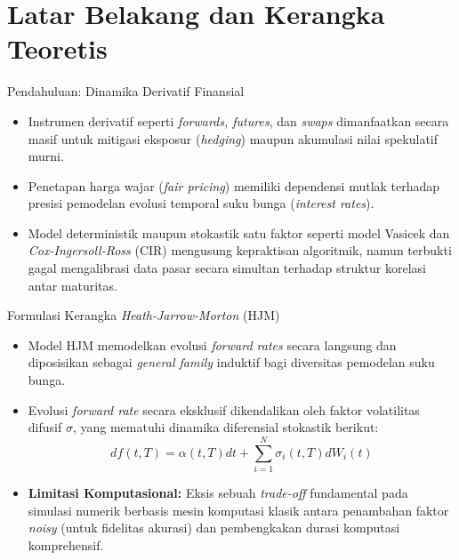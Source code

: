 \section{Latar Belakang dan Kerangka Teoretis}

\begin{frame}{Pendahuluan: Dinamika Derivatif Finansial}
    \begin{itemize}
        \item Instrumen derivatif seperti \textit{forwards, futures}, dan \textit{swaps} dimanfaatkan secara masif untuk mitigasi eksposur (\textit{hedging}) maupun akumulasi nilai spekulatif murni.
        \item Penetapan harga wajar (\textit{fair pricing}) memiliki dependensi mutlak terhadap presisi pemodelan evolusi temporal suku bunga (\textit{interest rates}).
        \item Model deterministik maupun stokastik satu faktor seperti model Vasicek dan \textit{Cox-Ingersoll-Ross} (CIR) mengusung kepraktisan algoritmik, namun terbukti gagal mengalibrasi data pasar secara simultan terhadap struktur korelasi antar maturitas.
    \end{itemize}
\end{frame}

\begin{frame}{Formulasi Kerangka \textit{Heath-Jarrow-Morton} (HJM)}
    \begin{itemize}
        \item Model HJM memodelkan evolusi \textit{forward rates} secara langsung dan diposisikan sebagai \textit{general family} induktif bagi diversitas pemodelan suku bunga.
        \item Evolusi \textit{forward rate} secara eksklusif dikendalikan oleh faktor volatilitas difusif $\sigma$, yang mematuhi dinamika diferensial stokastik berikut:
        $$ df(t, T) = \alpha(t, T)dt + \sum_{i=1}^N \sigma_i(t, T) dW_i(t) $$
        \item \textbf{Limitasi Komputasional:} Eksis sebuah \textit{trade-off} fundamental pada simulasi numerik berbasis mesin komputasi klasik antara penambahan faktor \textit{noisy} (untuk fidelitas akurasi) dan pembengkakan durasi komputasi komprehensif.
    \end{itemize}
\end{frame}

